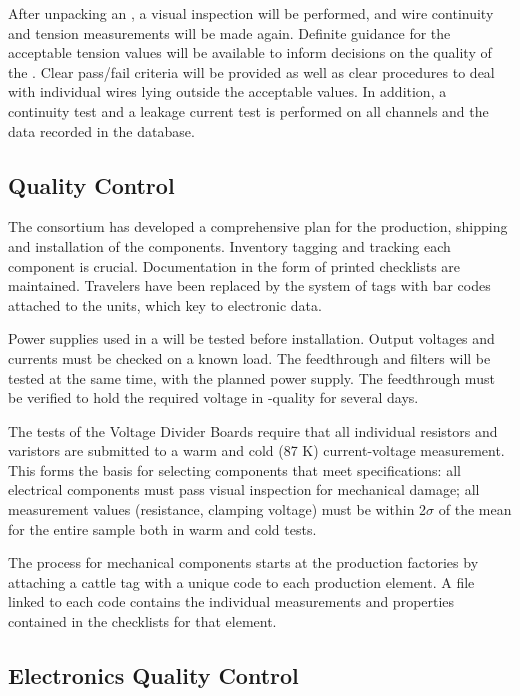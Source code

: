 After unpacking an , a visual inspection will be performed, and
wire continuity and tension measurements will be made again. Definite
guidance for the acceptable tension values will be available to inform
decisions on the quality of the . Clear pass/fail criteria will be
provided as well as clear procedures to deal with individual wires
lying outside the acceptable values. In addition, a continuity test
and a leakage current test is performed on all channels and the data
recorded in the database.

\subsection{ Quality Control}

The  consortium has developed a comprehensive 
plan for the production, shipping and installation of the
  components. Inventory tagging and tracking
each component is crucial. Documentation in the form of printed
checklists are maintained. Travelers have been replaced by the system
of tags with bar codes attached to the units, which key to electronic
 data.

Power supplies used in a  will be tested before
installation. Output voltages and currents must be checked on a known
load. The feedthrough and filters will be tested at the same time,
with the planned power supply. The feedthrough must be verified to
hold the required voltage in -quality  for several days.

The  tests of the Voltage Divider Boards require that all
individual resistors and varistors are submitted to a warm and cold
(87 K) current-voltage measurement. This forms the basis for selecting
components that meet specifications: all electrical components must
pass visual inspection for mechanical damage; all measurement values
(resistance, clamping voltage) must be within 2$\sigma$ of the mean for the
entire sample both in warm and cold tests.

The  process for mechanical components starts at the production
factories by attaching a cattle tag with a unique code to each
production element. A file linked to each code contains the individual
measurements and properties contained in the  checklists for that
element.

\subsection{ Electronics Quality Control}

